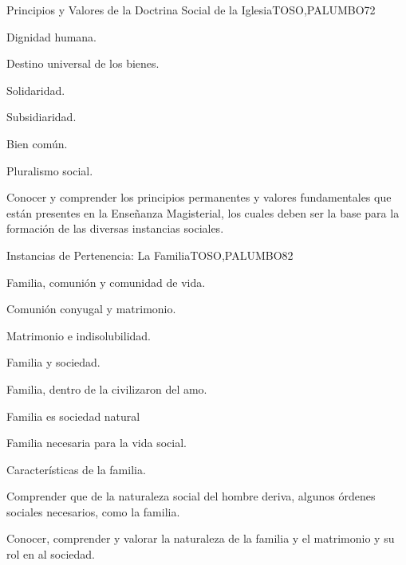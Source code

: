 \begin{syllabus}
\begin{unit}{Principios y Valores de la Doctrina Social de  la Iglesia}{TOSO,PALUMBO}{7}{2}
\begin{topics}
	\item Dignidad humana.
	\item Destino universal de los bienes.
	\item Solidaridad.
	\item Subsidiaridad.
	\item Bien común.
	\item Pluralismo social. 
\end{topics}
\begin{learningoutcomes}
	\item Conocer y comprender los principios permanentes y valores fundamentales que están presentes en la Enseñanza Magisterial, los cuales deben ser la base para la formación de las diversas instancias sociales.
\end{learningoutcomes}
\end{unit}

\begin{unit}{Instancias de Pertenencia: La Familia}{TOSO,PALUMBO}{8}{2}
\begin{topics}
	\item Familia, comunión y comunidad de vida.
	\item Comunión conyugal y matrimonio. 
	\item Matrimonio e indisolubilidad.
	\item Familia y sociedad.
	\item Familia, dentro de la civilizaron del amo.
	\item Familia es sociedad natural
	\item Familia necesaria para la vida social.
	\item Características de la familia.
\end{topics}
\begin{learningoutcomes}
	\item Comprender que de la naturaleza social del hombre deriva, algunos órdenes sociales necesarios, como la familia.
	\item Conocer, comprender y valorar la naturaleza de la familia y el matrimonio y su rol en al sociedad.
\end{learningoutcomes}
\end{unit}


\end{syllabus}
